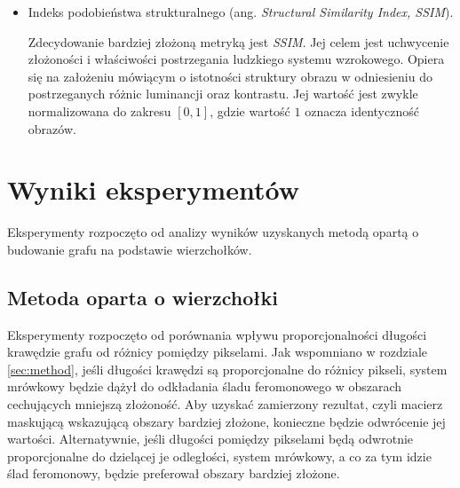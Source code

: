 {{\begin{itemize}
            \begin{equation}\label{eqt:psnr}
                PSNR = 10 \cdot log_{10} \frac{MAX^2}{MSE}
            \end{equation}

            \item Indeks podobieństwa strukturalnego (ang. \textit{Structural Similarity Index, SSIM}).

            Zdecydowanie bardziej złożoną metryką jest \textit{SSIM}. Jej celem jest uchwycenie złożoności i właściwości
            postrzegania ludzkiego systemu wzrokowego. Opiera się na założeniu mówiącym o istotności struktury obrazu w
            odniesieniu do postrzeganych różnic luminancji oraz kontrastu\cite{Wang2004ImageQA, Sara2019ImageQA}. Jej
            wartość jest zwykle normalizowana do zakresu $[0, 1]$, gdzie wartość $1$ oznacza identyczność obrazów.
        \end{itemize}
    }

    \section{Wyniki eksperymentów}
    {
        Eksperymenty rozpoczęto od analizy wyników uzyskanych metodą opartą o budowanie grafu na podstawie wierzchołków.

        \subsection{Metoda oparta o wierzchołki}
        {
            Eksperymenty rozpoczęto od porównania wpływu proporcjonalności długości krawędzie grafu od różnicy pomiędzy
            pikselami. Jak wspomniano w rozdziale \ref{sec:method}, jeśli długości krawędzi są proporcjonalne do różnicy
            pikseli, system mrówkowy będzie dążył do odkładania śladu feromonowego w obszarach cechujących mniejszą
            złożoność. Aby uzyskać zamierzony rezultat, czyli macierz maskującą wskazującą obszary bardziej złożone,
            konieczne będzie odwrócenie jej wartości. Alternatywnie, jeśli długości pomiędzy pikselami będą odwrotnie
            proporcjonalne do dzielącej je odległości, system mrówkowy, a co za tym idzie ślad feromonowy, będzie
            preferował obszary bardziej złożone.

}}}
